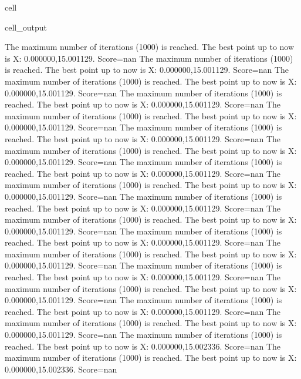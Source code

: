 \documentclass[letterpaper,10pt,english]{jupyterBook}
\begin{document}
\begin{sphinxuseclass}{cell}
\begin{sphinxVerbatimOutput}
\begin{sphinxuseclass}{cell_output}
\begin{sphinxVerbatim}[commandchars=\\\{\}]
The maximum number of iterations (1000) is reached. The best point up to now is X: \PYGZob{}0.000000,15.001129\PYGZcb{}. Score=\PYGZhy{}nan
The maximum number of iterations (1000) is reached. The best point up to now is X: \PYGZob{}0.000000,15.001129\PYGZcb{}. Score=\PYGZhy{}nan
The maximum number of iterations (1000) is reached. The best point up to now is X: \PYGZob{}0.000000,15.001129\PYGZcb{}. Score=\PYGZhy{}nan
The maximum number of iterations (1000) is reached. The best point up to now is X: \PYGZob{}0.000000,15.001129\PYGZcb{}. Score=\PYGZhy{}nan
The maximum number of iterations (1000) is reached. The best point up to now is X: \PYGZob{}0.000000,15.001129\PYGZcb{}. Score=\PYGZhy{}nan
The maximum number of iterations (1000) is reached. The best point up to now is X: \PYGZob{}0.000000,15.001129\PYGZcb{}. Score=\PYGZhy{}nan
The maximum number of iterations (1000) is reached. The best point up to now is X: \PYGZob{}0.000000,15.001129\PYGZcb{}. Score=\PYGZhy{}nan
The maximum number of iterations (1000) is reached. The best point up to now is X: \PYGZob{}0.000000,15.001129\PYGZcb{}. Score=\PYGZhy{}nan
The maximum number of iterations (1000) is reached. The best point up to now is X: \PYGZob{}0.000000,15.001129\PYGZcb{}. Score=\PYGZhy{}nan
The maximum number of iterations (1000) is reached. The best point up to now is X: \PYGZob{}0.000000,15.001129\PYGZcb{}. Score=\PYGZhy{}nan
The maximum number of iterations (1000) is reached. The best point up to now is X: \PYGZob{}0.000000,15.001129\PYGZcb{}. Score=\PYGZhy{}nan
The maximum number of iterations (1000) is reached. The best point up to now is X: \PYGZob{}0.000000,15.001129\PYGZcb{}. Score=\PYGZhy{}nan
The maximum number of iterations (1000) is reached. The best point up to now is X: \PYGZob{}0.000000,15.001129\PYGZcb{}. Score=\PYGZhy{}nan
The maximum number of iterations (1000) is reached. The best point up to now is X: \PYGZob{}0.000000,15.001129\PYGZcb{}. Score=\PYGZhy{}nan
The maximum number of iterations (1000) is reached. The best point up to now is X: \PYGZob{}0.000000,15.001129\PYGZcb{}. Score=\PYGZhy{}nan
The maximum number of iterations (1000) is reached. The best point up to now is X: \PYGZob{}0.000000,15.001129\PYGZcb{}. Score=\PYGZhy{}nan
The maximum number of iterations (1000) is reached. The best point up to now is X: \PYGZob{}0.000000,15.001129\PYGZcb{}. Score=\PYGZhy{}nan
The maximum number of iterations (1000) is reached. The best point up to now is X: \PYGZob{}0.000000,15.002336\PYGZcb{}. Score=\PYGZhy{}nan
The maximum number of iterations (1000) is reached. The best point up to now is X: \PYGZob{}0.000000,15.002336\PYGZcb{}. Score=\PYGZhy{}nan

\end{sphinxVerbatim}
\end{sphinxuseclass}
\end{sphinxVerbatimOutput}
\end{sphinxuseclass}
\end{document}
